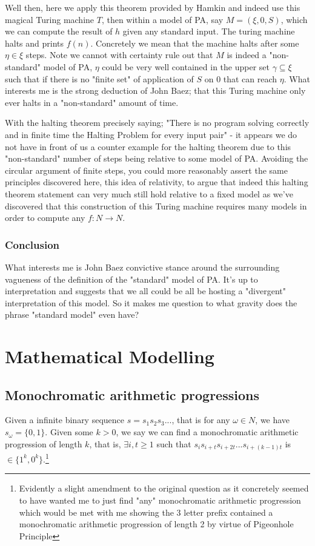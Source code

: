 \documentclass{article}
\begin{document}
Well then, here we apply this theorem provided by Hamkin and indeed use this magical Turing machine $T$, then within a model of PA, say $M = (\xi,0,S)$, which we can compute the result of $h$ given any standard input. The turing machine halts and prints $f(n)$. Concretely we mean that the machine halts after some $\eta \in \xi$ steps. Note we cannot with certainty rule out that $M$ is indeed a "non-standard" model of PA, $\eta$ could be very well contained in the upper set $\gamma \subseteq \xi$ such that if there is no "finite set" of application of $S$ on $0$ that can reach $\eta$. What interests me is the strong deduction of John Baez; that this Turing machine only ever halts in a "non-standard" amount of time.

With the halting theorem precisely saying; "There is no program solving correctly and in finite time the Halting Problem for every input pair" - it appears we do not have in front of us a counter example for the halting theorem due to this "non-standard" number of steps being relative to some model of PA. Avoiding the circular argument of finite steps, you could more reasonably assert the same principles discovered here, this idea of relativity, to argue that indeed this halting theorem statement can very much still hold relative to a fixed model as we've discovered that this construction of this Turing machine requires many models in order to compute any $f: N \rightarrow N$.

\subsubsection{Conclusion}
What interests me is John Baez convictive stance around the surrounding vagueness of the definition of the "standard" model of PA. It's up to interpretation and suggests that we all could be all be hosting a "divergent" interpretation of this model. So it makes me question to what gravity does the phrase "standard model" even have?

\pagebreak

\section{Mathematical Modelling}
\subsection{Monochromatic arithmetic progressions}
Given a infinite binary sequence $s = s_{1}s_{2}s_{3}...$, that is for any $\omega \in N$, we have $s_{\omega} = \{0, 1\}$. Given some $k > 0$, we say we can find a monochromatic arithmetic progression of length $k$, that is, $\exists i,t \geq 1$ such that $s_{i}s_{i+t}s_{i+2t}...s_{i+(k-1)t}$ is $\in \{1^k,0^k\}$.\footnote{Evidently a slight amendment to the original question as it concretely seemed to have wanted me to just find  "any" monochromatic arithmetic progression which would be met with me showing the 3 letter prefix contained a monochromatic arithmetic progression of length 2 by virtue of Pigeonhole Principle}
\end{document}

